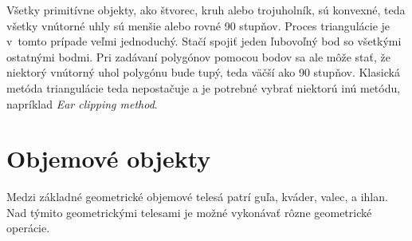 Všetky primitívne objekty, ako štvorec, kruh alebo trojuholník, sú konvexné, teda všetky vnútorné uhly sú menšie alebo rovné 90 stupňov. Proces triangulácie je v~tomto prípade veľmi jednoduchý. Stačí spojiť jeden ľubovoľný bod so všetkými ostatnými bodmi. Pri zadávaní polygónov pomocou bodov sa ale môže stať, že niektorý vnútorný uhol polygónu bude tupý, teda väčší ako 90 stupňov. Klasická metóda triangulácie teda nepostačuje a je potrebné vybrať niektorú inú metódu, napríklad \textit{Ear clipping method}.













































\section{Objemové objekty}
Medzi základné geometrické objemové telesá patrí guľa, kváder, valec, a ihlan. Nad týmito geometrickými telesami je možné vykonávať rôzne geometrické operácie.







